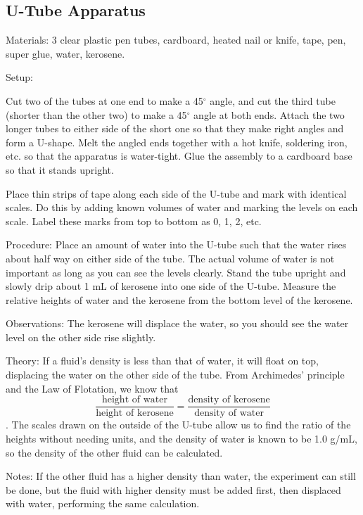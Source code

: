 \begin{multicols}{2}
\subsection{U-Tube Apparatus}
\label{sub:u-tube}

\begin{description*}
\item[Materials:]{3 clear plastic pen tubes, cardboard, heated nail or knife, tape, pen, super glue, water, kerosene.}
\item[Setup:]{Cut two of the tubes at one end to make a 45$^\circ$ angle, and cut the third tube (shorter than the other two) to make a 45$^\circ$ angle at both ends. Attach the two longer tubes to either side of the short one so that they make right angles and form a U-shape. Melt the angled ends together with a hot knife, soldering iron, etc. so that the apparatus is water-tight. Glue the assembly to a cardboard base so that it stands upright. 

Place thin strips of tape along each side of the U-tube and mark with identical scales. Do this by adding known volumes of water and marking the levels on each scale. Label these marks from top to bottom as 0, 1, 2, etc.}
\item[Procedure:]{Place an amount of water into the U-tube such that the water rises about half way on either side of the tube. The actual volume of water is not important as long as you can see the levels clearly. Stand the tube upright and slowly drip about 1 mL of kerosene into one side of the U-tube. Measure the relative heights of water and the kerosene from the bottom level of the kerosene.}
\item[Observations:]{The kerosene will displace the water, so you should see the water level on the other side rise slightly.}
\item[Theory:]{If a fluid’s density is less than that of water, it will float on top, displacing the water on the other side of the tube. From Archimedes’ principle and the Law of Flotation, we know that \[ \frac{\text{height of water}}{\text{height of kerosene}} = \frac{\text{density of kerosene}}{\text{density of water}} \]. The scales drawn on the outside of the U-tube allow us to find the ratio of the heights without needing units, and the density of water is known to be 1.0 g/mL, so the density of the other fluid can be calculated.}
\item[Notes:]{If the other fluid has a higher density than water, the experiment can still be done, but the fluid with higher density must be added first, then displaced with water, performing the same calculation.}
\end{description*}

\end{multicols}

\pagebreak